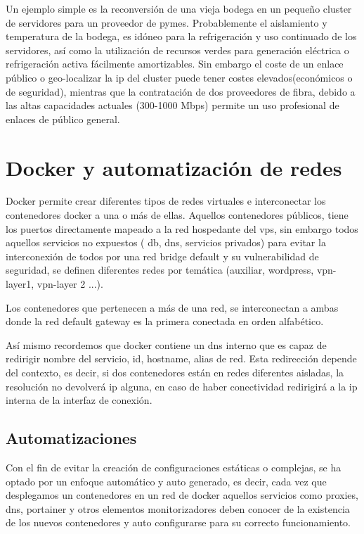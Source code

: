  Un ejemplo simple es la reconversión de una vieja bodega en un pequeño cluster de servidores para un proveedor de pymes. Probablemente el aislamiento y temperatura de la bodega, es idóneo para la refrigeración y uso continuado de los servidores, así como la utilización de recursos verdes para generación eléctrica o refrigeración activa fácilmente amortizables. Sin embargo el coste de un enlace público o geo-localizar la ip del cluster puede tener costes elevados(económicos o de seguridad), mientras que la contratación de dos proveedores de fibra, debido a las altas capacidades actuales (300-1000 Mbps) permite un uso profesional de enlaces de público general.

\section{Docker y automatización de redes}

Docker permite crear diferentes tipos de redes virtuales e interconectar los contenedores docker a una o más de ellas.
Aquellos contenedores públicos, tiene los puertos directamente mapeado a la red hospedante del vps, sin embargo todos aquellos servicios no expuestos ( db, dns, servicios privados) para evitar la interconexión de todos por una red bridge default y su vulnerabilidad de seguridad, se definen diferentes redes por temática (auxiliar, wordpress, vpn-layer1, vpn-layer 2 ...).

Los contenedores que pertenecen a más de una red, se interconectan a ambas donde la red default gateway es la primera conectada en orden alfabético.

Así mismo recordemos que docker contiene un dns interno que es capaz de redirigir nombre del servicio, id, hostname, alias de red. Esta redirección depende del contexto, es decir, si dos contenedores están en redes diferentes aisladas, la resolución no devolverá ip alguna, en caso de haber conectividad redirigirá a la ip interna de la interfaz de conexión.

\subsection{Automatizaciones}
Con el fin de evitar la creación de configuraciones estáticas o complejas, se ha optado por un enfoque automático y auto generado, es decir, cada vez que desplegamos un contenedores en un red de docker aquellos servicios como proxies, dns, portainer y otros elementos monitorizadores deben conocer de la existencia de los nuevos contenedores y auto configurarse para su correcto funcionamiento.

